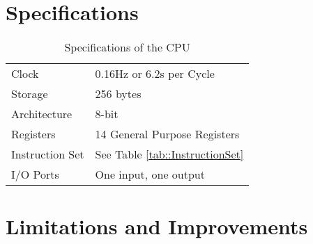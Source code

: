 \section{Specifications}
\begin{table}[h!]
    \caption{Specifications of the CPU}
    \label{tab::specs}
    \begin{center}
        \begin{tabular}{l @{\quad} l}
            Clock & 0.16Hz or 6.2s per Cycle \\
            Storage & 256 bytes \\
            Architecture & 8-bit \\
            Registers & 14 General Purpose Registers \\
            Instruction Set & See Table \ref{tab::InstructionSet} \\
            I/O Ports & One input, one output \\
        \end{tabular}
    \end{center}
\end{table}

\section{Limitations and Improvements} 

